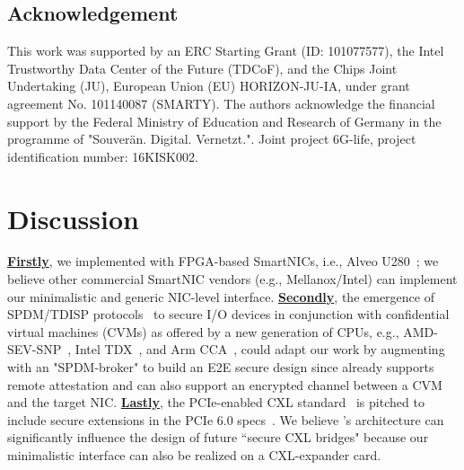 
\subsection*{Acknowledgement}
This work was supported by an ERC Starting Grant (ID: 101077577), the Intel Trustworthy Data Center of the Future (TDCoF), and the Chips Joint Undertaking (JU), European Union (EU) HORIZON-JU-IA, under grant agreement No. 101140087 (SMARTY).
The authors acknowledge the financial support by the Federal Ministry of Education and Research of Germany in the programme of "Souverän. Digital. Vernetzt.". Joint project 6G-life, project identification number: 16KISK002. 


\section{Discussion}

\underline{\bf Firstly}, we implemented \projecttitle{} with FPGA-based SmartNICs, i.e., Alveo U280~\cite{alveo_smartnics}; we believe other commercial SmartNIC vendors (e.g., Mellanox/Intel) can implement our minimalistic and generic NIC-level interface. \underline{\bf Secondly}, the emergence of SPDM/TDISP protocols~\cite{spdm,tdisp} to secure I/O devices in conjunction with confidential virtual machines (CVMs) as offered by a new generation of CPUs, e.g., AMD-SEV-SNP~\cite{amd-sev}, Intel TDX~\cite{intelTDX2}, and Arm CCA~\cite{arm-cca}, could adapt our work by augmenting \projecttitle{} with an "SPDM-broker" to build an E2E secure design since \projecttitle{} already supports remote attestation and can also support an encrypted channel between a CVM and the target NIC. \underline{\bf Lastly}, the PCIe-enabled CXL standard~\cite{cxl} is pitched to include secure extensions in the PCIe 6.0 specs~\cite{pcie6.0}. We believe \projecttitle{}'s architecture can significantly influence the design of future ``secure CXL bridges" because our minimalistic interface can also be realized on a CXL-expander card.

